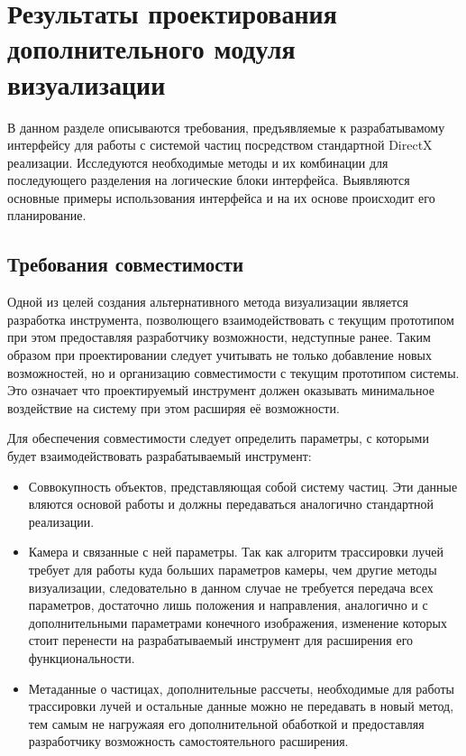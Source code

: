 \chapter{Результаты проектирования дополнительного модуля визуализации}

В данном разделе описываются требования, предъявляемые к разрабатывамому интерфейсу для работы с системой частиц посредством стандартной DirectX реализации. Исследуются необходимые методы и их комбинации для последующего разделения на логические блоки интерфейса. Выявляются основные примеры использования интерфейса и на их основе происходит его планирование.


\section{Требования совместимости}

Одной из целей создания альтернативного метода визуализации является разработка инструмента, позволющего взаимодействовать с текущим прототипом при этом предоставляя разработчику возможности, недступные ранее. Таким образом при проектировании следует учитывать не только добавление новых возможностей, но и организацию совместимости с текущим прототипом системы. Это означает что проектируемый инструмент должен оказывать минимальное воздействие на систему при этом расширяя её возможности.

Для обеспечения совместимости следует определить параметры, с которыми будет взаимодействовать разрабатываемый инструмент:

\begin{itemize}
	\item Соввокупность объектов, представляющая собой систему частиц. Эти данные вляются основой работы и должны передаваться аналогично стандартной реализации. 
	\item Камера и связанные с ней параметры. Так как алгоритм трассировки лучей требует для работы куда больших параметров камеры, чем другие методы визуализации, следовательно в данном случае не требуется передача всех параметров, достаточно лишь положения и направления, аналогично и с дополнительными параметрами конечного изображения, изменение которых стоит перенести на разрабатываемый инструмент для расширения его функциональности.
	\item Метаданные о частицах, дополнительные рассчеты, необходимые для работы трассировки лучей и остальные данные можно не передавать в новый метод, тем самым не нагружаяя его дополнительной обаботкой и предоставляя разработчику возможность самостоятельного расширения.
\end{itemize}

